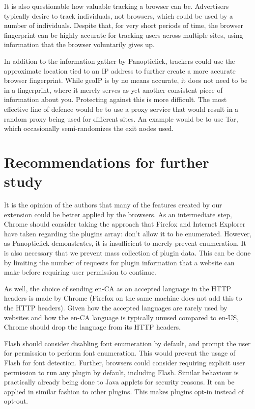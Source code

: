 \documentclass[12pt,a4paper]{article}
\begin{document}
It is also questionable how valuable tracking a browser can be. Advertisers typically desire to track individuals, not browsers, which could be used by a number of individuals. Despite that, for very short periods of time, the browser fingerprint can be highly accurate for tracking users across multiple sites, using information that the browser voluntarily gives up.

In addition to the information gather by Panopticlick, trackers could use the approximate location tied to an IP address to further create a more accurate browser fingerprint. While geoIP is by no means accurate, it does not need to be in a fingerprint, where it merely serves as yet another consistent piece of information about you. Protecting against this is more difficult. The most effective line of defence would be to use a proxy service that would result in a random proxy being used for different sites. An example would be to use Tor\cite{tor}, which occasionally semi-randomizes the exit nodes used.

\section{Recommendations for further study}
It is the opinion of the authors that many of the features created by our extension could be better applied by the browsers. As an intermediate step, Chrome should consider taking the approach that Firefox and Internet Explorer have taken regarding the plugins array: don't allow it to be enumerated. However, as Panopticlick demonstrates, it is insufficient to merely prevent enumeration. It is also necessary that we prevent mass collection of plugin data. This can be done by limiting the number of requests for plugin information that a website can make before requiring user permission to continue.

As well, the choice of sending en-CA as an accepted language in the HTTP headers is made by Chrome (Firefox on the same machine does not add this to the HTTP headers). Given how the accepted languages are rarely used by websites and how the en-CA language is typically unused compared to en-US, Chrome should drop the language from its HTTP headers.

Flash should consider disabling font enumeration by default, and prompt the user for permission to perform font enumeration. This would prevent the usage of Flash for font detection. Further, browsers could consider requiring explicit user permission to run any plugin by default, including Flash. Similar behaviour is practically already being done to Java applets for security reasons. It can be applied in similar fashion to other plugins. This makes plugins opt-in instead of opt-out.
\end{document}
